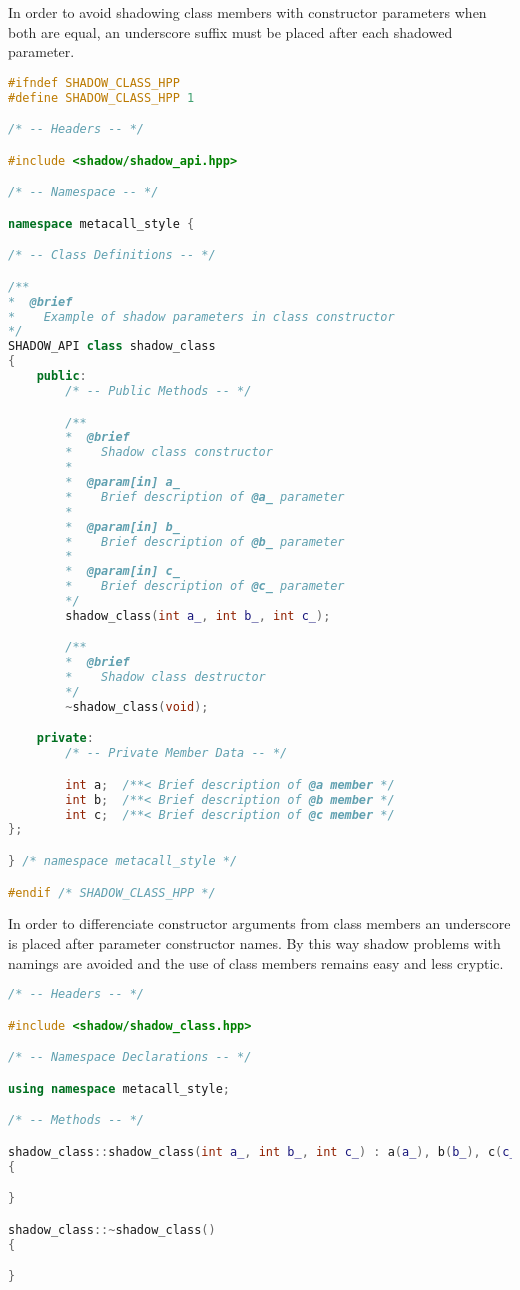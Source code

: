 \documentclass{article}
\begin{document}
In order to avoid shadowing class members with constructor parameters when both are equal, an underscore
suffix must be placed after each shadowed parameter.

% 

\begin{lstlisting}[language=C++,label=shadow_class_header,caption=Member-Constructor Shadow Class Header]
#ifndef SHADOW_CLASS_HPP
#define SHADOW_CLASS_HPP 1

/* -- Headers -- */

#include <shadow/shadow_api.hpp>

/* -- Namespace -- */

namespace metacall_style {

/* -- Class Definitions -- */

/**
*  @brief
*    Example of shadow parameters in class constructor
*/
SHADOW_API class shadow_class
{
	public:
		/* -- Public Methods -- */

		/**
		*  @brief
		*    Shadow class constructor
		*
		*  @param[in] a_
		*    Brief description of @a_ parameter
		*
		*  @param[in] b_
		*    Brief description of @b_ parameter
		*
		*  @param[in] c_
		*    Brief description of @c_ parameter
		*/
		shadow_class(int a_, int b_, int c_);

		/**
		*  @brief
		*    Shadow class destructor
		*/
		~shadow_class(void);

	private:
		/* -- Private Member Data -- */

		int a;	/**< Brief description of @a member */
		int b;	/**< Brief description of @b member */
		int c;	/**< Brief description of @c member */
};

} /* namespace metacall_style */

#endif /* SHADOW_CLASS_HPP */
\end{lstlisting}

In order to differenciate constructor arguments from class members an underscore is placed after
parameter constructor names. By this way shadow problems with namings are avoided and the use of
class members remains easy and less cryptic.


% 

\begin{lstlisting}[language=C++,label=shadow_class_source,caption=Member-Constructor Shadow Class Source]
/* -- Headers -- */

#include <shadow/shadow_class.hpp>

/* -- Namespace Declarations -- */

using namespace metacall_style;

/* -- Methods -- */

shadow_class::shadow_class(int a_, int b_, int c_) : a(a_), b(b_), c(c_)
{

}

shadow_class::~shadow_class()
{

}
\end{lstlisting}
\end{document}
